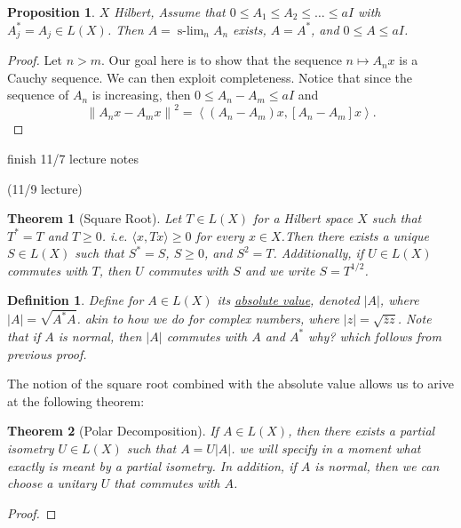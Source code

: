 \documentclass[letterpaper,twoside,11pt]{article}
\theoremstyle{mystyle}
\newtheorem{theorem}{Theorem}[section]
\newtheorem{definition}{Definition}[section]
\newtheorem{prop}{Proposition}[section]
\DeclareMathOperator*{\slim}{s-lim}
\newcommand{\cg}{\color{gray}}
\newcommand{\cbk}{\color{black}}
\newcommand{\cred}{\color{red}}
\newcommand{\cblu}{\color{blue}}
\begin{document}
\begin{prop}
  $X$ Hilbert, Assume that $0\leq A_1 \leq A_2 \leq \dots \leq aI$ with $A_j^* = A_j \in L(X)$. Then $A= \slim_n A_n$ exists, $A= A^*$, and $0\leq A \leq aI$. 
\end{prop}
\begin{proof}
  Let $n>m$. \cg Our goal here is to show that the sequence $n\mapsto A_n x$ is a Cauchy sequence. We can then exploit completeness. \cbk Notice that since the sequence of $A_n$ is increasing, then $0 \leq A_n - A_m \leq aI$ and 
  \[{\left\| {{A_n}x - {A_m}x} \right\|^2} = \left\langle {\left( {{A_n} - {A_m}} \right)x,\left[ {{A_n} - {A_m}} \right]x} \right\rangle .\]
\end{proof}

\cred finish 11/7 lecture notes \cbk 

\cblu (11/9 lecture) \cbk 

\begin{tcolorbox}[colback=red!5!white,colframe=red!75!black]
\begin{theorem}[Square Root]
  Let $T\in L(X)$ for a Hilbert space $X$ such that $T^*=T$ and $T \geq 0$. \cg i.e. $\langle x, Tx\rangle \geq 0$ for every $x\in X$.\cbk  Then there exists a unique $S\in L(X)$ such that $S^* = S$, $S\geq 0$, and $S^2 = T$. Additionally, if $U\in L(X)$ commutes with $T$, then $U$ commutes with $S$ and we write $S = T^{1/2}$. 
\end{theorem}
\end{tcolorbox}

\begin{definition}
  Define for $A\in L(X)$ its \underline{absolute value}, denoted $|A|$, where $|A| = \sqrt{A^*A}$. \cg akin to how we do for complex numbers, where $|z| =\sqrt{\bar z z }$. \cbk Note that if $A$ is normal, then $|A|$ commutes with $A$ and $A^*$ \cred why? \cbk which follows from previous proof.   
\end{definition}
The notion of the square root combined with the absolute value allows us to arive at the following theorem: 

\begin{tcolorbox}[colback=red!5!white,colframe=red!75!black]
\begin{theorem}[Polar Decomposition]
  If $A\in L(X)$, then there exists a partial isometry $U\in L(X)$ such that $A = U|A|$. \cg we will specify in a moment what exactly is meant by a partial isometry. \cbk In addition, if $A$ is normal, then we can choose a unitary $U$ that commutes with $A$. 
\end{theorem}
\end{tcolorbox}
\begin{proof}
  
\end{proof}
\end{document}
